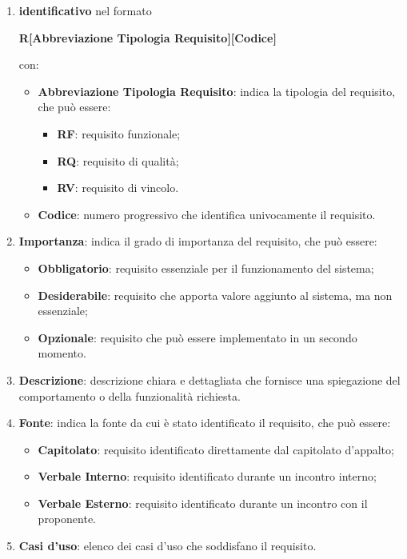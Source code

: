 \begin{enumerate}
	\item \textbf{identificativo} nel formato \begin{center}\textbf{R[Abbreviazione Tipologia Requisito][Codice]}\end{center} con:\\
	\begin{itemize}
		\item \textbf{Abbreviazione Tipologia Requisito}: indica la tipologia del requisito, che può essere:
		\begin{itemize}
			\item \textbf{RF}: requisito funzionale;
			\item \textbf{RQ}: requisito di qualità;
			\item \textbf{RV}: requisito di vincolo.
		\end{itemize}
		\item \textbf{Codice}: numero progressivo che identifica univocamente il requisito.
	\end{itemize}
	\item \textbf{Importanza}: indica il grado di importanza del requisito, che può essere:
	\begin{itemize}
		\item \textbf{Obbligatorio}: requisito essenziale per il funzionamento del sistema;
		\item \textbf{Desiderabile}: requisito che apporta valore aggiunto al sistema, ma non essenziale;
		\item \textbf{Opzionale}: requisito che può essere implementato in un secondo momento.
	\end{itemize}
	\item \textbf{Descrizione}: descrizione chiara e dettagliata che fornisce una spiegazione del comportamento o della funzionalità richiesta.
	\item \textbf{Fonte}: indica la fonte da cui è stato identificato il requisito, che può essere:\\
	\begin{itemize}
		\item \textbf{Capitolato}: requisito identificato direttamente dal capitolato d'appalto;
		\item \textbf{Verbale Interno}: requisito identificato durante un incontro interno;
		\item \textbf{Verbale Esterno}: requisito identificato durante un incontro con il proponente.
	\end{itemize}
	\item \textbf{Casi d'uso}: elenco dei casi d'uso che soddisfano il requisito.
\end{enumerate}



